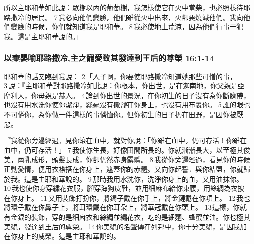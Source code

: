所以主耶和華如此說：眾樹以內的葡萄樹，我怎樣使它在火中當柴，也必照樣待耶路撒冷的居民。 7 我必向他們變臉，他們雖從火中出來，火卻要燒滅他們。我向他們變臉的時候，你們就知道我是耶和華。 8 我必使地土荒涼，因為他們行事干犯我。這是主耶和華說的。」


\subsubsection{以棄嬰喻耶路撒冷,主之寵愛致其發達到王后的尊榮 16:1-14}
耶和華的話又臨到我說： 2 「人子啊，你要使耶路撒冷知道她那些可憎的事， 3 說：『主耶和華對耶路撒冷如此說：你根本，你出世，是在迦南地，你父親是亞摩利人，你母親是赫人。 4 論到你出世的景況，在你初生的日子沒有為你斷臍帶，也沒有用水洗你使你潔淨，絲毫沒有撒鹽在你身上，也沒有用布裹你。 5 誰的眼也不可憐你，為你做一件這樣的事憐恤你。但你初生的日子扔在田野，是因你被厭惡。

『我從你旁邊經過，見你滾在血中，就對你說：「你雖在血中，仍可存活！你雖在血中，仍可存活！」 7 我使你生長，好像田間所長的。你就漸漸長大，以至極其俊美，兩乳成形，頭髮長成，你卻仍然赤身露體。 
8 我從你旁邊經過，看見你的時候正動愛情，便用衣襟搭在你身上，遮蓋你的赤體。又向你起誓，與你結盟，你就歸於我。這是主耶和華說的。 9 那時我用水洗你，洗淨你身上的血，又用油抹你。 10 我也使你身穿繡花衣服，腳穿海狗皮鞋，並用細麻布給你束腰，用絲綢為衣披在你身上。 11 又用裝飾打扮你，將鐲子戴在你手上，將金鏈戴在你項上。 12 我也將環子戴在你鼻子上，將耳環戴在你耳朵上，將華冠戴在你頭上。 13 這樣，你就有金銀的裝飾，穿的是細麻衣和絲綢並繡花衣，吃的是細麵、蜂蜜並油。你也極其美貌，發達到王后的尊榮。 14 你美貌的名聲傳在列邦中，你十分美貌，是因我加在你身上的威榮。這是主耶和華說的。

